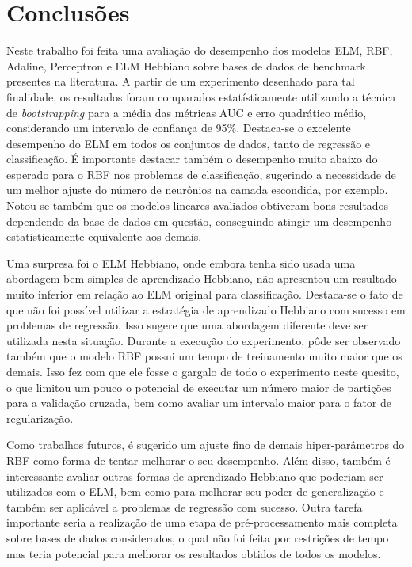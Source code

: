 \documentclass[conference]{IEEEtran}
\begin{document}
	
	
	\section{Conclusões}
	
	Neste trabalho foi feita uma avaliação do desempenho dos modelos ELM, RBF, Adaline, Perceptron e ELM Hebbiano sobre bases de dados de benchmark presentes na literatura. A partir de um experimento desenhado para tal finalidade, os resultados foram comparados estatísticamente utilizando a técnica de \textit{bootstrapping} para a média das métricas AUC e erro quadrático médio, considerando um intervalo de confiança de 95\%. Destaca-se o excelente desempenho do ELM em todos os conjuntos de dados, tanto de regressão e classificação. É importante destacar também o desempenho muito abaixo do esperado para o RBF nos problemas de classificação, sugerindo a necessidade de um melhor ajuste do número de neurônios na camada escondida, por exemplo. Notou-se também que os modelos lineares avaliados obtiveram bons resultados dependendo da base de dados em questão, conseguindo atingir um desempenho estatisticamente equivalente aos demais.
	
	Uma surpresa foi o ELM Hebbiano, onde embora tenha sido usada uma abordagem bem simples de aprendizado Hebbiano, não apresentou um resultado muito inferior em relação ao ELM original para classificação. Destaca-se o fato de que não foi possível utilizar a estratégia de aprendizado Hebbiano com sucesso em problemas de regressão. Isso sugere que uma abordagem diferente deve ser utilizada nesta situação. Durante a execução do experimento, pôde ser observado também que o modelo RBF possui um tempo de treinamento muito maior que os demais. Isso fez com que ele fosse o gargalo de todo o experimento neste quesito, o que limitou um pouco o potencial de executar um número maior de partições para a validação cruzada, bem como avaliar um intervalo maior para o fator de regularização. 
	
	Como trabalhos futuros, é sugerido um ajuste fino de demais hiper-parâmetros do RBF como forma de tentar melhorar o seu desempenho. Além disso, também é interessante avaliar outras formas de aprendizado Hebbiano que poderiam ser utilizados com o ELM, bem como para melhorar seu poder de generalização e também ser aplicável a problemas de regressão com sucesso. Outra tarefa importante seria a realização de uma etapa de pré-processamento mais completa sobre bases de dados considerados, o qual não foi feita por restrições de tempo mas teria potencial para melhorar os resultados obtidos de todos os modelos.
		


    
	
	
\end{document}
